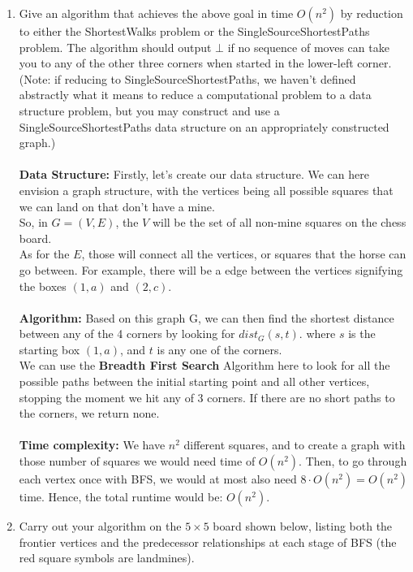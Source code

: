 \documentclass[11pt]{article}
\begin{document}
\begin{enumerate}
    \begin{enumerate}
    \item Give an algorithm that achieves the above goal in time $O(n^2)$ by reduction to either the ShortestWalks problem or the SingleSourceShortestPaths problem. The algorithm should output $\bot$ if no sequence of moves can take you to any of the other three corners when started in the lower-left corner. (Note: if reducing to SingleSourceShortestPaths, we haven't defined abstractly what it means to reduce a computational problem to a data structure problem, but you may construct and use a SingleSourceShortestPaths data structure on an appropriately constructed graph.)
    \\\\ \textbf{Data Structure:} Firstly, let's create our data structure. We can here envision a graph structure, with the vertices being all possible squares that we can land on that don't have a mine.
    \\ So, in $G = (V, E)$, the $V$ will be the set of all non-mine squares on the chess board.
    \\ As for the $E$, those will connect all the vertices, or squares that the horse can go between. For example, there will be a edge between the vertices signifying the boxes $(1, a)$ and $(2, c)$. 
    \\\\ \textbf{Algorithm:} Based on this graph G, we can then find the shortest distance between any of the 4 corners by looking for $dist_G(s, t)$. where $s$ is the starting box $(1, a)$, and $t$ is any one of the corners. 
    \\ We can use the \textbf{Breadth First Search} Algorithm here to look for all the possible paths between the initial starting point and all other vertices, stopping the moment we hit any of 3 corners. If there are no short paths to the corners, we return none.
    \\\\ \textbf{Time complexity:} We have $n^2$ different squares, and to create a graph with those number of squares we would need time of $O(n^2)$. Then, to go through each vertex once with BFS, we would at most also need $8\cdot O(n^2) = O(n^2)$ time. Hence, the total runtime would be: $O(n^2)$.
    \\
    \item Carry out your algorithm on the $5\times 5$ board shown below, listing both the frontier vertices and the predecessor relationships at each stage of BFS (the red square symbols are landmines).
    

\end{enumerate}
\end{enumerate}
\end{document}
